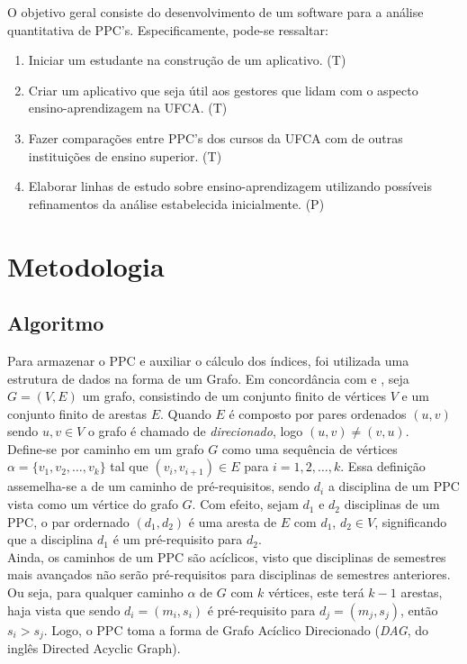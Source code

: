 \documentclass[a4paper, 12pt]{article}
\begin{document}
O objetivo geral consiste do desenvolvimento de um software para a análise quantitativa de PPC's. Especificamente, pode-se ressaltar: 

\begin{enumerate}
\item Iniciar um estudante na construção de um aplicativo. (T)
\item Criar um aplicativo que seja útil aos gestores que lidam com o aspecto ensino-aprendizagem na UFCA. (T)
\item Fazer comparações entre PPC's dos cursos da UFCA com de outras instituições de ensino superior. (T)
\item Elaborar linhas de estudo sobre ensino-aprendizagem utilizando possíveis refinamentos da análise estabelecida inicialmente. (P)
\end{enumerate}

\section*{Metodologia}

\subsection*{Algoritmo}

Para armazenar o PPC e auxiliar o cálculo dos índices, foi utilizada uma estrutura de dados na forma de um Grafo. Em concordância com \cite{book_cormen} e \cite{book_sedgewick}, seja $G = (V, E)$ um grafo, consistindo de um conjunto finito de vértices $V$ e um conjunto finito de arestas $E$. Quando $E$ é 
composto por pares ordenados $(u, v)$ sendo $u, v \in V$ o grafo é chamado de \textit{direcionado}, logo $(u, v) \neq (v, u)$. \\

Define-se por caminho em um grafo $G$ como uma sequência de vértices $\alpha = \{ v_1, v_2, \dots, v_k \}$ tal que $(v_i, v_{i+1}) \in E$ para $i = 1, 2, \dots, k$.
Essa definição assemelha-se a de um caminho de pré-requisitos, sendo $d_i$ a disciplina de um PPC vista como um vértice do grafo $G$. Com efeito, sejam $d_1$ e 
$d_2$ disciplinas de um PPC, o par ordernado $(d_1, d_2)$ é uma aresta de $E$ com $d_1$, $d_2 \in V$, significando que a disciplina $d_1$ é um pré-requisito 
para $d_2$. \\

Ainda, os caminhos de um PPC são acíclicos, visto que disciplinas de semestres mais avançados não serão pré-requisitos para disciplinas de semestres 
anteriores. Ou seja, para qualquer caminho $\alpha$ de $G$ com $k$ vértices, este terá $k-1$ arestas, haja vista que sendo $d_i=(m_i, s_i)$ é pré-requisito para 
$d_j=(m_j, s_j)$, então $s_i > s_j$. Logo, o PPC toma a forma de Grafo Acíclico Direcionado (\textit{DAG}, do inglês Directed Acyclic Graph). \\
\end{document}
